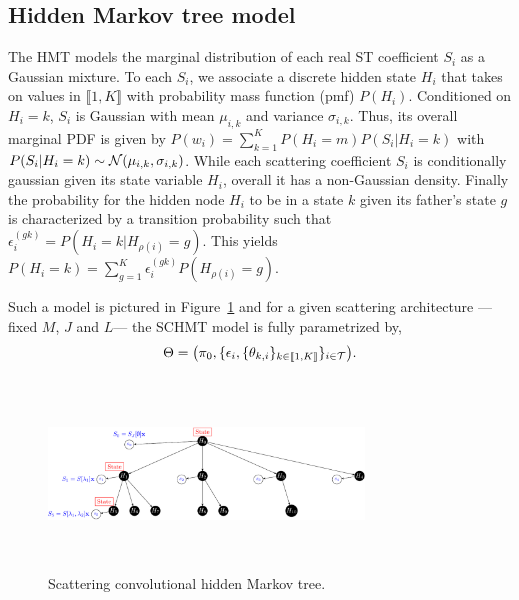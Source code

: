 \documentclass{article}
\begin{document}
  \vspace{-5pt}
  \subsection{Hidden Markov tree model}
    \label{subsec:SCHMT/HMT model}
    \vspace{-5pt}
    The HMT models the marginal distribution of each real ST coefficient $S_i$ as a Gaussian mixture. To each $S_i$, we associate a discrete hidden state $H_i$ that takes on values in $\llbracket 1,K \rrbracket$ with probability mass function (pmf) $P(H_i)$. Conditioned on $H_i = k$, $S_i$ is Gaussian with mean $\mu_{i,k}$ and variance $\sigma_{i,k}$. Thus, its overall marginal PDF is given by $P(w_i) = \sum_{k=1}^{K} P(H_i = m)P(S_i| H_i=k)$ with $P(S_i|H_i=k) \sim \mathcal{N}(\mu_{i,k}, \sigma_{i,k})$. While each scattering coefficient $S_i$ is conditionally gaussian given its state variable $H_i$, overall it has a non-Gaussian density. Finally the probability for the hidden node $H_{i}$ to be in a state $k$ given its father's state $g$ is characterized by a transition probability such that $\epsilon_{i}^{(gk)} = P(H_{i}= k | H_{\rho(i)}=g)$. This yields $P(H_{i}=k) = \sum_{g=1}^{K} \epsilon_{i}^{(gk)} P(H_{\rho(i)}=g)$.

    Such a model is pictured in Figure~\ref{fig:SCHMT 1} and for a given scattering architecture ---\ie fixed $M$, $J$ and $L$--- the SCHMT model is fully parametrized by,
    \vspace{-5pt}
    \begin{equation}
      \Theta = \big(\pi_{0}, \{ \epsilon_{i}, \{ \theta_{k,i} \}_{k\in\llbracket1,K\rrbracket} \}_{i\in\mathcal{T}}\big).
      \label{eq:SCHMT - parameters}
    \end{equation}
    \vspace{-15pt}

    \begin{figure}
      \begin{center}
        \includegraphics[width=3.3in, height=2in, keepaspectratio]{scat_HMT_crop.pdf}
        \caption{Scattering convolutional hidden Markov tree.}
        \label{fig:SCHMT 1}
      \end{center}
      \vspace{-15pt}
    \end{figure}
    
\end{document}
